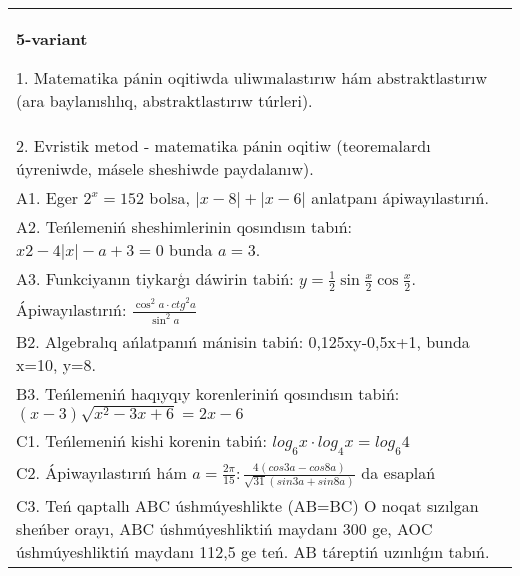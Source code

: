 \documentclass{article}
\begin{document}
\begin{tabular}{m{17cm}}
\textbf{5-variant}

1. Matematika pánin oqitiwda uliwmalastırıw hám abstraktlastırıw (ara baylanıslılıq, abstraktlastırıw túrleri). \\
2. Evristik metod - matematika pánin oqitiw (teoremalardı úyreniwde, másele sheshiwde paydalanıw). \\
A1. Eger \(2^{x} = 152\) bolsa, \(|x - 8| + |x - 6|\) anlatpanı ápiwayılastırıń. \\
A2. Teńlemeniń sheshimlerinin qosındısın tabıń: \(x2 - 4|x| - a + 3 = 0\) bunda \(a = 3\). \\
A3. Funkciyanın tiykarģı dáwirin tabiń: \(y = \frac{1}{2}\sin{\frac{x}{2}\cos\frac{x}{2}}\). \\
Ápiwayılastırıń: \(\frac{\cos^{2}a \cdot {ctg}^{2}a}{\sin^{2}a}\) \\
B2. Algebralıq ańlatpanıń mánisin tabiń: 0,125xy-0,5x+1, bunda x=10, y=8. \\
B3. Teńlemeniń haqıyqıy korenleriniń qosındısın tabiń: \((x-3) \sqrt{x^{2} - 3x + 6} = 2x - 6\) \\
C1. Teńlemeniń kishi korenin tabiń: \(log_{6}x \cdot log_{4}x = log_{6}4\) \\
C2. Ápiwayılastırıń hám \(a = \frac{2\pi}{15}:\frac{4 (cos3a - cos8a) }{\sqrt{31} (sin3a + sin8a) }\) da esaplań \\
C3. Teń qaptallı ABC úshmúyeshlikte (AB=BC) O noqat sızılgan sheńber orayı, ABC úshmúyeshliktiń maydanı 300 ge, AOC úshmúyeshliktiń maydanı 112,5 ge teń. AB táreptiń uzınlıǵın tabıń. \\

\end{tabular}
\vspace{1cm}
\end{document}

